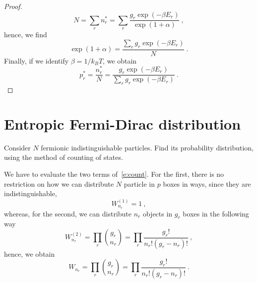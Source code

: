 \begin{proof}
        \begin{equation*}
            N = \sum_r n_r^* = \sum_r \frac{g_r \exp(- \beta E_r)}{\exp(1 + \alpha)} ~,
        \end{equation*}
        hence, we find
        \begin{equation*}
            \exp(1 + \alpha) = \frac{\sum_r g_r \exp(- \beta E_r)}{N} ~.
        \end{equation*}
        Finally, if we identify $\beta = 1/k_B T$, we obtain
        \begin{equation*}
            p_r^* = \frac{n_r^*}{N} = \frac{g_r \exp(- \beta E_r)}{\sum_r g_r \exp(- \beta E_r)} ~.
        \end{equation*}
    \end{proof}
    
\section{Entropic Fermi-Dirac distribution}

    \begin{exercise}
        Consider $N$ fermionic indistinguishable particles. Find its probability distribution, using the method of counting of states.
    \end{exercise}

    We have to evaluate the two terms of~\eqref{e:count}. For the first, there is no restriction on how we can distribute $N$ particle in $p$ boxes in ways, since they are indistinguishable,
    \begin{equation*}
        W^{(1)}_{n_r} = 1 ~,
    \end{equation*}
    whereas, for the second, we can distribute $n_r$ objects in $g_r$ boxes in the following way
    \begin{equation*}
        W^{(2)}_{n_r} = \prod_r \binom{g_r}{n_r} = \prod_r \frac{g_r!}{n_r! (g_r - n_r)!} ~,
    \end{equation*}
    hence, we obtain
    \begin{equation*}
        W_{n_r} = \prod_r \binom{g_r}{n_r} = \prod_r \frac{g_r!}{n_r! (g_r - n_r)!} ~.
    \end{equation*}
    
